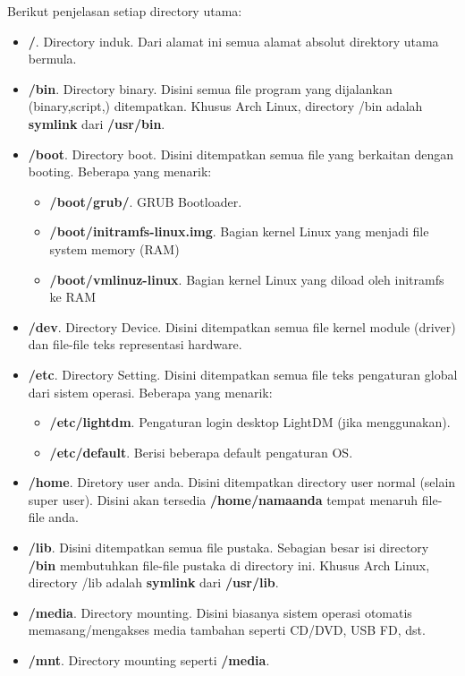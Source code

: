 \documentclass[12pt,]{article}
\begin{document}
	Berikut penjelasan setiap directory utama:
	\begin{itemize}
		\item \textbf{/}. Directory induk. Dari alamat ini semua alamat absolut direktory utama bermula.
		\item \textbf{/bin}. Directory binary. Disini semua file program yang dijalankan (binary,script,) ditempatkan.
		Khusus Arch Linux, directory /bin adalah \textbf{symlink} dari \textbf{/usr/bin}.
		\item \textbf{/boot}. Directory boot. Disini ditempatkan semua file yang berkaitan dengan booting. Beberapa yang menarik:
		\begin{itemize}
			\item \textbf{/boot/grub/}. GRUB Bootloader.
			\item \textbf{/boot/initramfs-linux.img}. Bagian kernel Linux yang menjadi file system memory (RAM)
			\item \textbf{/boot/vmlinuz-linux}. Bagian kernel Linux yang diload oleh initramfs ke RAM
		\end{itemize}
		\item \textbf{/dev}. Directory Device. Disini ditempatkan semua file kernel module (driver) dan file-file teks representasi hardware.
		\item \textbf{/etc}. Directory Setting. Disini ditempatkan semua file teks pengaturan global dari sistem operasi. Beberapa yang menarik:
		\begin{itemize}
			\item \textbf{/etc/lightdm}. Pengaturan login desktop LightDM (jika menggunakan).
			\item \textbf{/etc/default}. Berisi beberapa default pengaturan OS.
		\end{itemize}
		\item \textbf{/home}. Diretory user anda. Disini ditempatkan directory user normal (selain super user).
		Disini akan tersedia \textbf{/home/namaanda} tempat menaruh file-file anda.
		\item \textbf{/lib}. Disini ditempatkan semua file pustaka.
		Sebagian besar isi directory \textbf{/bin} membutuhkan file-file pustaka di directory ini.
		Khusus Arch Linux, directory /lib adalah \textbf{symlink} dari \textbf{/usr/lib}.
		\item \textbf{/media}. Directory mounting.
		Disini biasanya sistem operasi otomatis memasang/mengakses media tambahan seperti CD/DVD, USB FD, dst.
		\item \textbf{/mnt}. Directory mounting seperti \textbf{/media}.

\end{itemize}
\end{document}
